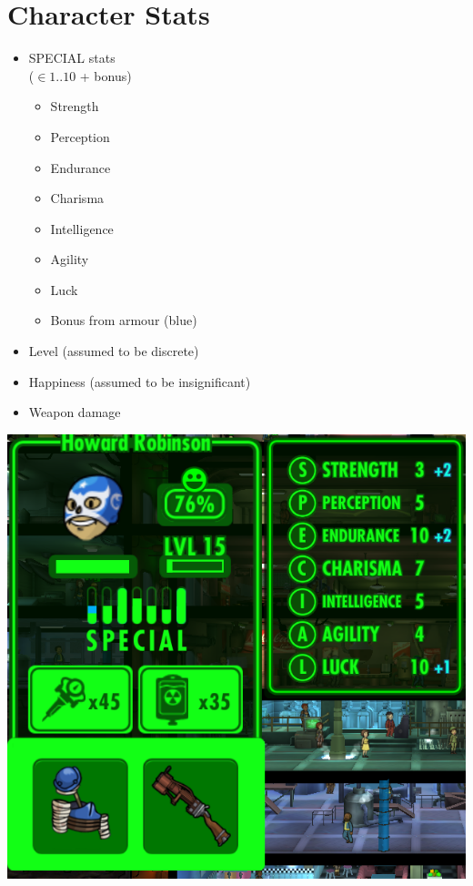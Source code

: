 \documentclass{beamer}
\begin{document}
\section{Character Stats}
\begin{frame}
  \begin{minipage}{.45\textwidth}
  \begin{itemize}
  \item SPECIAL stats\\($\in 1..10$ + bonus)
  \begin{itemize}
  \item Strength
  \item Perception 
  \item Endurance 
  \item Charisma 
  \item Intelligence 
  \item Agility 
  \item Luck
  \item Bonus from armour (blue)
  \end{itemize}
  \item Level (assumed to be discrete)
  \item Happiness (assumed to be insignificant)
  \item Weapon damage
  \end{itemize}
  \end{minipage}
  \hfill
  \begin{minipage}{.45\textwidth}
  \includegraphics[width=\textwidth]{stats}
  \end{minipage}
\end{frame}
\end{document}
